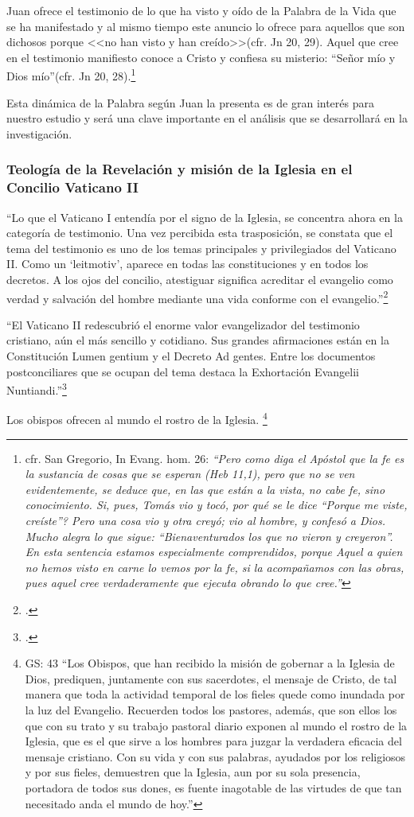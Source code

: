 \documentclass[12pt]{article}
\begin{document}
{Juan ofrece el testimonio de lo que ha visto y oído de la Palabra de la Vida que se ha manifestado y al mismo tiempo este anuncio lo ofrece para aquellos que son dichosos porque <<no han visto y han creído>>(cfr. Jn 20, 29). Aquel que cree en el testimonio manifiesto conoce a Cristo y confiesa su misterio: ``Señor mío y Dios mío''(cfr. Jn 20, 28).\footnote{cfr. San Gregorio, In Evang. hom. 26: \emph{``Pero como diga el Apóstol que la fe es la sustancia de cosas que se esperan (Heb 11,1), pero que no se ven evidentemente, se deduce que, en las que están a la vista, no cabe fe, sino conocimiento. Si, pues, Tomás vio y tocó, \textquestiondown por qué se le dice ``Porque me viste, creíste''? Pero una cosa vio y otra creyó; vio al hombre, y confesó a Dios. Mucho alegra lo que sigue: ``Bienaventurados los que no vieron y creyeron''. En esta sentencia estamos especialmente comprendidos, porque Aquel a quien no hemos visto en carne lo vemos por la fe, si la acompañamos con las obras, pues aquel cree verdaderamente que ejecuta obrando lo que cree.''}
}

Esta dinámica de la Palabra según Juan la presenta es de gran interés para nuestro estudio y será una clave importante en el análisis que se desarrollará en la investigación.

\subsubsection{Teología de la Revelación y misión de la Iglesia en el Concilio Vaticano II}

``Lo que el Vaticano I entendía por el signo de la Iglesia, se concentra ahora en la categoría de testimonio. Una vez percibida esta trasposición, se constata que el tema del testimonio es uno de los temas principales y privilegiados del Vaticano II. Como un `leitmotiv', aparece en todas las constituciones y en todos los decretos. A los ojos del concilio, atestiguar significa acreditar el evangelio como verdad y salvación del hombre mediante una vida conforme con el evangelio.''\footcite[p.~1532]{dicctf}

``El Vaticano II redescubrió el enorme valor evangelizador del testimonio cristiano, aún el más sencillo y cotidiano. Sus grandes afirmaciones están en la Constitución Lumen gentium y el Decreto Ad gentes. Entre los documentos postconciliares que se ocupan del tema destaca la Exhortación Evangelii Nuntiandi.''\footcite[pp.~378--379]{ftcpellitero}

Los obispos ofrecen al mundo el rostro de la Iglesia.
\footnote{
GS: 43
``Los Obispos, que han recibido la misión de gobernar a la Iglesia de Dios, prediquen, juntamente con sus sacerdotes, el mensaje de Cristo, de tal manera que toda la actividad temporal de los fieles quede como inundada por la luz del Evangelio. Recuerden todos los pastores, además, que son ellos los que con su trato y su trabajo pastoral diario exponen al mundo el rostro de la Iglesia, que es el que sirve a los hombres para juzgar la verdadera eficacia del mensaje cristiano. Con su vida y con sus palabras, ayudados por los religiosos y por sus fieles, demuestren que la Iglesia, aun por su sola presencia, portadora de todos sus dones, es fuente inagotable de las virtudes de que tan necesitado anda el mundo de hoy.''
}

}
\end{document}

